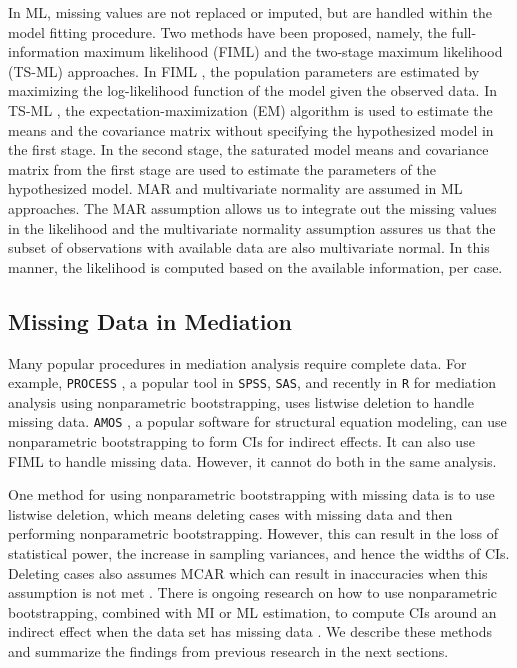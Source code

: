 \documentclass[man]{apa7}\usepackage[]{graphicx}\usepackage[]{xcolor}
\begin{document}
In ML,
missing values are not replaced or imputed,
but are handled within the model fitting procedure.
Two methods have been proposed,
namely,
the full-information maximum likelihood (FIML)
and the two-stage maximum likelihood (TS-ML) approaches.
In FIML
\parencite{Lib-Missing-Data-Arbuckle-1996},
the population parameters are estimated
by maximizing the log-likelihood function of the model given the observed data.
In TS-ML
\parencite{Lib-Missing-Data-Yuan-2000},
the expectation-maximization (EM) algorithm
is used to estimate the means and the covariance matrix
without specifying the hypothesized model in the first stage.
In the second stage,
the saturated model means and covariance matrix
from the first stage are used to estimate the parameters of the
hypothesized model.
MAR and multivariate normality are assumed in ML approaches.
The MAR assumption allows us to integrate out the missing values in the likelihood
and the multivariate normality assumption assures us that the subset of observations with available data are also multivariate normal.
In this manner,
the likelihood is computed based on the available information,
per case.

\subsection{Missing Data in Mediation}

Many popular procedures in mediation analysis
require complete data.
For example,
\texttt{PROCESS}
\parencite{Lib-Mediation-Books-Hayes-2022,
Lib-Mediation-Bootstrap-Preacher-2004},
a popular tool in
\texttt{SPSS},
\texttt{SAS},
and recently in
\texttt{R}
for mediation analysis using nonparametric bootstrapping,
uses listwise deletion to handle missing data.
\texttt{AMOS}
\parencite{Lib-Structural-Equation-Modeling-Software-Manuals-Arbuckle-2021},
a popular software for structural equation modeling,
can use nonparametric bootstrapping
to form CIs for indirect effects.
It can also use FIML to handle missing data.
However,
it cannot do both in the same analysis.

One method for using nonparametric bootstrapping with missing data
is to use listwise deletion,
which means deleting cases with missing data
and then performing nonparametric bootstrapping. 
However,
this can result in the loss of statistical power,
the increase in sampling variances,
and hence the widths of CIs.
Deleting cases also assumes MCAR
which can result in inaccuracies
when this assumption is not met
\parencite{Lib-Missing-Data-Rubin-1976}.
There is ongoing research on how to use nonparametric bootstrapping,
combined with MI or ML estimation,
to compute CIs around an indirect effect
when the data set has missing data
\parencite{Lib-Mediation-Missing-Data-Zhang-2012,
Lib-Mediation-Missing-Data-Wu-2013,
Lib-Mediation-Missing-Data-Zhang-2015}.
We describe these methods and summarize the findings
from previous research in the next sections.
\end{document}
